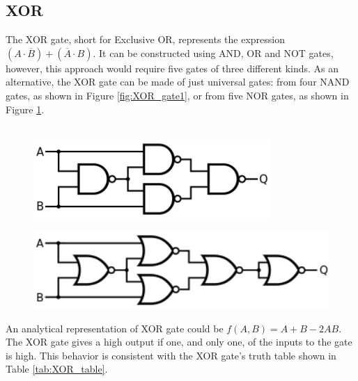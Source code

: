 \subsection{XOR}
    The XOR gate, short for Exclusive OR, represents the expression $(A\cdot {\overline {B}})+({\overline {A}}\cdot B)$.
    It can be constructed using AND, OR and NOT gates, however, this approach would require five gates of three different kinds. 
    As an alternative, the XOR gate can be made of just universal gates: from four NAND gates, as shown in Figure \ref{fig:XOR_gate1}, or from five NOR gates, as shown in Figure \ref{fig:XOR_gate2}. \\\\	
    \begin{figure}[H]   
        \begin{minipage}{0.5\textwidth}
            \centering
            \includegraphics[width=0.8\textwidth]{figures/circuits/XOR_from_NAND.png}
            \label{fig:XOR_gate1} 
        \end{minipage}
        \begin{minipage}{0.5\textwidth}
            \centering
            \includegraphics[width=1\textwidth]{figures/circuits/XOR_from_NOR.png}
            \label{fig:XOR_gate2} 
        \end{minipage}
	\end{figure}
    
    \noindent
    An analytical representation of XOR gate could be $f(A,B)=A+B-2AB$. 
    The XOR gate gives a high output if one, and only one, of the inputs to the gate is high. 
    This behavior is consistent with the XOR gate's truth table shown in Table \ref{tab:XOR_table}. \\


